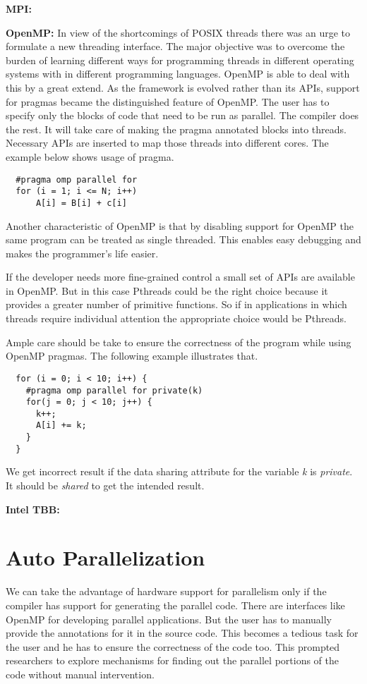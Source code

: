 \documentclass[a4paper,12pt]{book}
\begin{document}
\textbf{MPI:}

\textbf{OpenMP:} In view of the shortcomings of POSIX threads there was an urge to formulate a new threading
interface. The major objective was to overcome the burden of learning different ways for programming threads in different
operating systems with in different programming languages. OpenMP is able to deal with this
by a great extend. As the framework is evolved rather than its APIs, support for pragmas became the distinguished
feature of OpenMP. The user has to specify only the blocks of code that need to be run
as parallel. The compiler does the rest. It will take care of making the pragma annotated blocks into
threads. Necessary APIs are inserted to map those threads into different cores. The example below
shows usage of pragma.

{\footnotesize
\begin{lstlisting}
  #pragma omp parallel for
  for (i = 1; i <= N; i++)
      A[i] = B[i] + c[i]
\end{lstlisting}
}

Another characteristic of OpenMP is that by disabling support for OpenMP the same program can be treated as
single threaded. This enables easy debugging and makes the programmer's life easier.

If the developer needs more fine-grained control a small set of APIs are available in OpenMP. But in this case Pthreads
could be the right choice because it provides a greater number of primitive functions. So if in applications
in which threads require individual attention the appropriate choice would be Pthreads.

Ample care should be take to ensure the correctness of the program while using OpenMP pragmas. The following
example illustrates that.
{\footnotesize
\begin{lstlisting}
  for (i = 0; i < 10; i++) {
    #pragma omp parallel for private(k)
    for(j = 0; j < 10; j++) {
      k++;
      A[i] += k;
    }
  }
\end{lstlisting}
}

We get incorrect result if the data sharing attribute for the variable \emph{k} is \emph {private}. It should
be \emph{shared} to get the intended result.


\textbf{Intel TBB:}

\section{Auto Parallelization}
We can take the advantage of hardware support for parallelism only if the compiler has
support for generating the parallel code. There are interfaces like OpenMP for
developing parallel applications. But the user has to manually provide the annotations
for it in the source code. This becomes a tedious task for the user and he has to
ensure the correctness of the code too. This prompted researchers to explore
mechanisms for finding out the parallel portions of the code without manual intervention.
\end{document}
